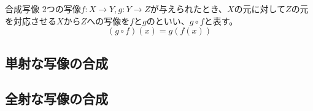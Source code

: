 \documentclass[../../../topic_linear-algebra]{subfiles}
\begin{document}
\begin{definition*}{合成写像}
  2つの写像$f\colon X \to Y, g\colon Y \to Z$が与えられたとき、$X$の元に対して$Z$の元を対応させる$X$から$Z$への写像を$f$と$g$のといい、$g \circ f$と表す。
  \begin{equation*}
    (g \circ f)(x) = g(f(x))
  \end{equation*}
\end{definition*}

\subsection{単射な写像の合成}

\begin{mindflow}
\end{mindflow}

\subsection{全射な写像の合成}

\begin{mindflow}
\end{mindflow}
\end{document}
